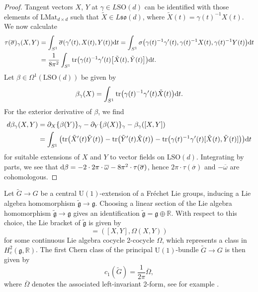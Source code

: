 \documentclass[10pt,a4paper]{amsart}
\numberwithin{equation}{section}
\newcommand{\R}{\mathbb{R}}
\newcommand{\tr}{\mathrm{tr}}
\newcommand{\SO}{\mathrm{SO}}
\newcommand{\U}{\mathrm{U}}
\renewcommand{\L}{\mathrm{L}}
\begin{document}
\begin{proof}
Tangent vectors $X$, $Y$ at $\gamma \in L\SO(d)$ can be identified with those elements of $\L \mathrm{Mat}_{d\times d}$ such that $\tilde{X} \in L\mathfrak{so}(d)$, where $\tilde{X}(t) = \gamma(t)^{-1}X(t)$. We now calculate
 \begin{align*}
 \tau(\overline{\sigma})_\gamma(X, Y)
 &= \int_{S^1} \overline{\sigma}(\gamma^\prime(t), X(t), Y(t)) {\rm d}t= \int_{S^1} \sigma\big( \gamma(t)^{-1}\gamma^\prime(t), \gamma(t)^{-1} X(t), \gamma(t)^{-1}Y(t)\big) {\rm d}t\\
 &= \frac{1}{8 \pi^2}\int_{S^1}\tr\big(\gamma(t)^{-1}\gamma^\prime(t) \big[\tilde{X}(t), \tilde{Y}(t)\big]\big) {\rm d}t.
 \end{align*}
 Let $\beta \in \Omega^1(\L\SO(d))$ be given by
 \begin{equation*}
 \beta_\gamma(X) = \int_{S^1} \tr \big( 	\gamma(t)^{-1}\gamma^\prime(t) \tilde{X}(t)\big) {\rm d}t.
 \end{equation*}
For the exterior derivative of $\beta$, we find
 \begin{align*}
 d\beta_\gamma(X, Y) &= \partial_X \{ \beta(Y)\}_\gamma - \partial_Y \{ \beta(X)\}_\gamma - \beta_\gamma([X, Y]) \\
 &= \int_{S^1} \big( \tr \big(\tilde{X}^\prime(t) \tilde{Y}(t)\big) - \tr \big(\tilde{Y}^\prime(t) \tilde{X}(t)\big) - \tr\big(\gamma(t)^{-1}\gamma^\prime(t) [\tilde{X}(t), \tilde{Y}(t)]\big)\big) {\rm d}t
 \end{align*}
 for suitable extensions of $X$ and $Y$ to vector fields on $\L\SO(d)$.
 Integrating by parts, we see that ${\rm d} \beta = - 2 \cdot 2\pi \cdot \overline{\omega} - 8 \pi^2 \cdot \tau(\overline{\sigma})$, hence $2 \pi \cdot \tau(\overline{\sigma})$ and $-\overline{\omega}$ are cohomologous.
\end{proof}

Let $\tilde{G} \to G$ be a central $\U(1)$-extension of a Fr\'echet Lie groups, inducing a Lie algebra homomorphism $\tilde{\mathfrak{g}} \to \mathfrak{g}$.
Choosing a linear section of the Lie algebra homomorphism $\tilde{\mathfrak{g}} \to \mathfrak{g}$ gives an identification $\tilde{\mathfrak{g}} = \mathfrak{g} \oplus \R$.
With respect to this choice, the Lie bracket of $\tilde{\mathfrak{g}}$ is given by
\begin{equation*}
 	[(X, \lambda), (Y, \mu)] = ([X, Y], \Omega(X, Y))
\end{equation*}
for some continuous Lie algebra cocycle 2-cocycle $\Omega$, which represents a class in $H^2_c(\mathfrak{g}, \R)$.
The first Chern class of the principal $\U(1)$-bundle $\tilde{G} \to G$ is then given by
\begin{equation}
\label{ChernClassVsCocycle}
 c_1(\tilde{G}) = \frac{1}{2\pi} \overline{\Omega}, 	
\end{equation}
where $\overline{\Omega}$ denotes the associated left-invariant 2-form, see for example \cite[Proposition~4.5.6]{PressleySegal}.
\end{document}
